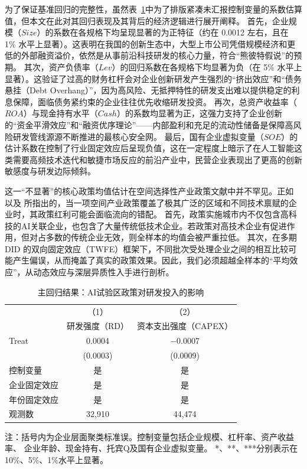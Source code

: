\documentclass[12pt,hyperref,a4paper,UTF8]{ctexart}
\begin{document}
为了保证基准回归的完整性，虽然表~\ref{tab:main}中为了排版紧凑未汇报控制变量的系数估算值，但本文在此对其回归表现及其背后的经济逻辑进行展开阐释。
首先，企业规模（$Size$）的系数在各规格下均呈现显著的为正特征（约在 0.0012 左右，且在 1\% 水平上显著）。这表明在我国的创新生态中，大型上市公司凭借规模经济和更低的外部融资溢价，依然是从事前沿科技研发的核心力量，符合“熊彼特假说”的预期。
其次，资产负债率（$Lev$）的回归系数在各规格下均显著为负（在 5\% 水平上显著）。这验证了过高的财务杠杆会对企业创新研发产生强烈的“挤出效应”和“债务悬挂（Debt Overhang）”，因为高风险、无抵押特性的研发支出难以提供稳定的利息保障，面临债务紧约束的企业往往优先收缩研发投资。
再次，总资产收益率（$ROA$）与现金持有水平（$Cash$）的系数均显著为正，这强力支持了企业创新的“资金平滑效应”和“融资优序理论”——内部盈利和充足的流动性储备是保障高风险研发管线源源不断推进的最核心安全网。
最后，国有企业虚拟变量（$SOE$）的估计系数在控制了行业固定效应后呈现负值，这在一定程度上暗示了在人工智能这类需要高频技术迭代和敏捷市场反应的前沿产业中，民营企业表现出了更高的创新敏感度与研发边际倾斜。

这一“不显著”的核心政策均值估计在空间选择性产业政策文献中并不罕见。正如 \textcite{neumark2011enterprise} 以及 \textcite{lu2017industrial} 所指出的，当一项空间产业政策覆盖了极其广泛的区域和不同技术禀赋的企业时，其政策红利可能会面临流向的错配。
首先，政策实施城市内不仅包含高科技的AI关联企业，也包含了大量传统低技术企业。若政策对高技术企业有促进作用，但对占多数的传统企业无效，则全样本的均值会被严重拉低。
其次，在多期 DID 的双向固定效应（TWFE）框架下，不同批次受处理企业之间的相互比较可能产生偏误，从而掩盖了真实的政策效果。因此，我们必须超越全样本的“平均效应”，从动态效应与深层异质性入手进行剖析。

\begin{table}[htbp]
\centering
\caption{主回归结果：AI试验区政策对研发投入的影响}
\label{tab:main}
\begin{threeparttable}
\begin{tabular*}{\textwidth}{@{\extracolsep{\fill}}lcc}
\toprule
 & \multicolumn{1}{c}{（1）} & \multicolumn{1}{c}{（2）} \\
 & 研发强度（RD） & 资本支出强度（CAPEX） \\
\midrule
Treat & 0.0004 & $-$0.0007 \\
 & (0.0003) & (0.0009) \\
\midrule
控制变量 & 是 & 是 \\
企业固定效应 & 是 & 是 \\
年份固定效应 & 是 & 是 \\
观测数 & 32,910 & 44,474 \\
\bottomrule
\end{tabular*}
\begin{tablenotes}
\item 注：括号内为企业层面聚类标准误。控制变量包括企业规模、杠杆率、资产收益率、
企业年龄、现金持有、托宾Q及国有企业虚拟变量。
*、**、***分别表示在10\%、5\%、1\%水平上显著。
\end{tablenotes}
\end{threeparttable}
\end{table}
\end{document}

